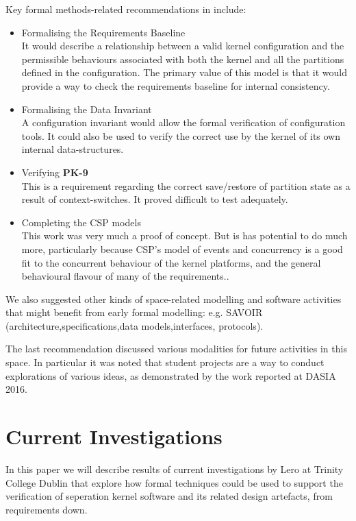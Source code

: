 Key formal methods-related recommendations in \cite{FMEIMAKQP-R1} include:
\begin{itemize}
  \item
    Formalising the Requirements Baseline\\
    It would describe a relationship between a valid kernel configuration
    and the permissible behaviours associated
    with both the kernel and all the partitions defined in the configuration.
    The primary value of this model
    is that it would provide a way to check the requirements
    baseline for internal consistency.
  \item
    Formalising the Data Invariant\\
    A configuration invariant would allow the formal verification
    of configuration tools.
    It could also be used to verify the correct use by the kernel of its
    own internal data-structures.
  \item
    Verifying \textbf{PK-9}\\
    This is a requirement regarding the correct save/restore of partition state
    as a result of context-switches.
    It proved difficult to test adequately.
  \item
    Completing the CSP models\\
    This work \cite{KH-MCS2016} was very much a proof of concept.
    But is has potential to do much more,
    particularly because CSP's model of events and concurrency
    is a good fit to the concurrent behaviour of the kernel platforms,
    and the general behavioural flavour of many of the requirements..
\end{itemize}
We also suggested other kinds of space-related modelling and software
activities that might benefit from early formal modelling:
e.g. SAVOIR (architecture,specifications,data models,interfaces, protocols).

The last recommendation discussed various modalities
for future activities in this space.
In particular it was noted that student projects
are a way to conduct explorations of various ideas,
as demonstrated by the work reported at DASIA 2016.

\section{Current Investigations}

In this paper we will describe results of current investigations
by Lero at Trinity College Dublin that explore how formal techniques
could be used to support the verification of seperation kernel software
and its related design artefacts, from requirements down.

